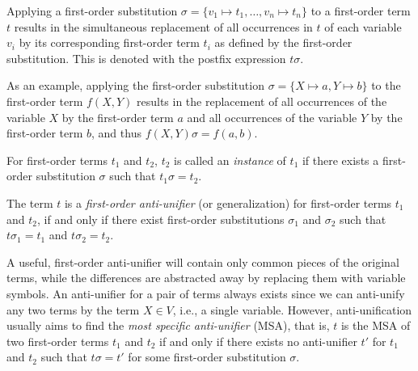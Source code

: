 \begin{defn}\label{def:substitution}
Applying a first-order substitution $\sigma = \{v_1 \mapsto t_1, \ldots, v_n \mapsto t_n\}$ to a first-order term $t$ results in the simultaneous replacement of all occurrences in $t$ of each variable $v_i$ by its corresponding first-order term $t_i$ as defined by the first-order substitution. This is denoted with the postfix expression $t\sigma$.
\end{defn}

As an example, applying the first-order substitution $\sigma = \{X \mapsto a, Y \mapsto b\}$
to the first-order term $f(X,Y)$ results in the replacement of all occurrences of the variable $X$ by the first-order term $a$ and all occurrences of the variable $Y$ by the first-order term $b$, and thus $f(X,Y)\sigma = f(a,b)$.

\begin{defn}\label{def:instance}
For first-order terms $t_1$ and $t_2$, $t_2$ is called an \emph{instance} of $t_1$ if there exists a first-order substitution $\sigma$ such that $t_1\sigma = t_2$.
\end{defn}



\begin{defn}\label{def:generalization}
The term $t$ is a \emph{first-order anti-unifier} (or generalization) for first-order terms $t_1$ and $t_2$, if and only if there exist first-order substitutions $\sigma_1$ and $\sigma_2$ such that $t\sigma_1=t_1$ and $t\sigma_2=t_2$.
\end{defn}

A useful, first-order anti-unifier will contain only common pieces of the original terms, while the differences are abstracted away by replacing them with variable symbols. An anti-unifier for a pair of terms always exists since we can anti-unify any two terms by the term $X\in V$, i.e., a single variable. However, anti-unification usually aims to find the \emph{most specific anti-unifier} (MSA), that is, $t$ is the MSA of two first-order terms $t_1$ and $t_2$ if and only if there exists no anti-unifier $t'$ for $t_1$ and $t_2$ such that $t\sigma = t'$ for some first-order substitution $\sigma$.

